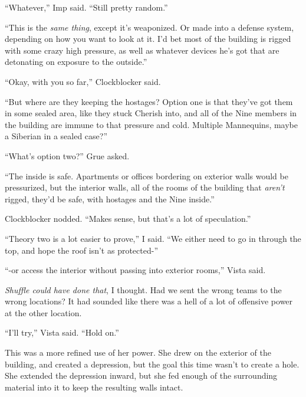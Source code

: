 ``Whatever,'' Imp said.  ``Still pretty random.''



``This is the \emph{same thing}, except it's weaponized.  Or made into a defense system, depending on how you want to look at it.  I'd bet most of the building is rigged with some crazy high pressure, as well as whatever devices he's got that are detonating on exposure to the outside.''



``Okay, with you so far,'' Clockblocker said.



``But where are they keeping the hostages?  Option one is that they've got them in some sealed area, like they stuck Cherish into, and all of the Nine members in the building are immune to that pressure and cold.  Multiple Mannequins, maybe a Siberian in a sealed case?''



``What's option two?'' Grue asked.



``The inside is safe.  Apartments or offices bordering on exterior walls would be pressurized, but the interior walls, all of the rooms of the building that \emph{aren't} rigged, they'd be safe, with hostages and the Nine inside.''



Clockblocker nodded.  ``Makes sense, but that's a lot of speculation.''



``Theory two is a lot easier to prove,'' I said.  ``We either need to go in through the top, and hope the roof isn't as protected-''



``-or access the interior without passing into exterior rooms,'' Vista said.



\emph{Shuffle could have done that}, I thought.  Had we sent the wrong teams to the wrong locations?  It had sounded like there was a hell of a lot of offensive power at the other location.



``I'll try,'' Vista said.  ``Hold on.''



This was a more refined use of her power.  She drew on the exterior of the building, and created a depression, but the goal this time wasn't to create a hole.  She extended the depression inward, but she fed enough of the surrounding material into it to keep the resulting walls intact.



